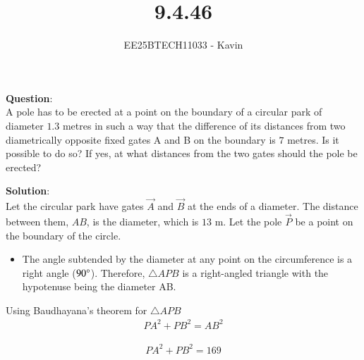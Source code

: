 \documentclass[journal]{IEEEtran}
\begin{document}

\vspace{3cm}

\title{9.4.46}
\author{EE25BTECH11033 - Kavin}
{\let\newpage\relax\maketitle}

\renewcommand{\thefigure}{\theenumi}
\renewcommand{\thetable}{\theenumi}
\setlength{\intextsep}{10pt} %
\textbf{Question}:\\
A pole has to be erected at a point on the boundary of a circular park of diameter $1.3$ metres in such a way that the difference of its distances from two diametrically opposite fixed gates A and B on the boundary is $7$ metres. Is it possible to do so? If yes, at what distances from the two gates should the pole be erected?\\    
\bigskip

\textbf{Solution}:\\

Let the circular park have gates $\vec{A}$ and $\vec{B}$ at the ends of a diameter. The distance between them, $AB$, is the diameter, which is $13$ m. Let the pole $\vec{P}$ be a point on the boundary of the circle.

\begin{itemize}
    \item The angle subtended by the diameter at any point on the circumference is a right angle ($90\degree$). Therefore, $\triangle APB$ is a right-angled triangle with the hypotenuse being the diameter AB.
\end{itemize}


Using Baudhayana's theorem for $\triangle APB$
\begin{align*}
 PA^2 + PB^2 = AB^2     
\end{align*}


\begin{align}
PA^2 + PB^2 = 169
\end{align}
\end{document}

